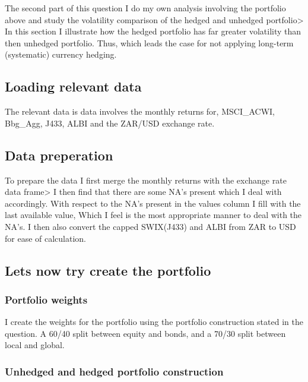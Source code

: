 \documentclass[11pt,preprint, authoryear]{elsarticle}
\numberwithin{equation}{section}
\numberwithin{figure}{section}
\numberwithin{table}{section}
\begin{document}
The second part of this question I do my own analysis involving the
portfolio above and study the volatility comparison of the hedged and
unhedged portfolio\textgreater{} In this section I illustrate how the
hedged portfolio has far greater volatility than then unhedged
portfolio. Thus, which leads the case for not applying long-term
(systematic) currency hedging.

\hypertarget{loading-relevant-data}{%
\subsection{Loading relevant data}\label{loading-relevant-data}}

The relevant data is data involves the monthly returns for, MSCI\_ACWI,
Bbg\_Agg, J433, ALBI and the ZAR/USD exchange rate.

\hypertarget{data-preperation}{%
\subsection{Data preperation}\label{data-preperation}}

To prepare the data I first merge the monthly returns with the exchange
rate data frame\textgreater{} I then find that there are some NA's
present which I deal with accordingly. With respect to the NA's present
in the values column I fill with the last available value, Which I feel
is the most appropriate manner to deal with the NA's. I then also
convert the capped SWIX(J433) and ALBI from ZAR to USD for ease of
calculation.

\hypertarget{lets-now-try-create-the-portfolio}{%
\subsection{Lets now try create the
portfolio}\label{lets-now-try-create-the-portfolio}}

\hypertarget{portfolio-weights}{%
\subsubsection{Portfolio weights}\label{portfolio-weights}}

I create the weights for the portfolio using the portfolio construction
stated in the question. A 60/40 split between equity and bonds, and a
70/30 split between local and global.

\hypertarget{unhedged-and-hedged-portfolio-construction}{%
\subsubsection{Unhedged and hedged portfolio
construction}\label{unhedged-and-hedged-portfolio-construction}}
\end{document}
